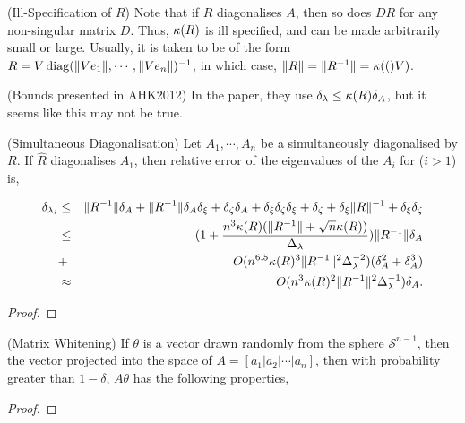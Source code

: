 \begin{remark} (Ill-Specification of $R$)
  Note that if $R$ diagonalises $A$, then so does $DR$ for any non-singular matrix $D$. Thus, $\kappa(R)$ is ill specified, and can be made arbitrarily small or large. Usually, it is taken to be of the form $R = V\operatorname{diag}(\|V e_1\|, \cdots, \|V e_n\|)^{-1}$, in which case, $\|R\| = \|R^{-1}\| = \kappa(()V)$.
\end{remark}

\begin{remark} (Bounds presented in AHK2012)
    In the paper, they use $\delta_{\lambda} \le \kappa(R)\delta_A$, but
    it seems like this may not be true.
\end{remark}

\begin{proposition}(Simultaneous Diagonalisation)
  \label{prop:sim-eigd}
  Let $A_1, \cdots, A_n$ be a simultaneously diagonalised by $R$. If $\hat{R}$ diagonalises $A_1$, then relative
    error of the eigenvalues of the $A_i$ for ($i > 1$) is,

    \begin{eqnarray}
    \delta_{\lambda_i} 
      &\le& \|R^{-1}\| \delta_{A} + \|R^{-1}\| \delta_{A} \delta_{\xi}
            + \delta_{\zeta} \delta_{A} + \delta_{\xi} \delta_{\zeta} \delta_{\xi}
            + \delta_{\zeta} + \delta_{\xi} \|R\|^{-1} + \delta_{\xi} \delta_{\zeta} \\
      &\le& (1 + \frac{ n^3 \kappa(R) (\|R^{-1}\| + \sqrt{n} \kappa(R))}{\Delta_{\lambda}} ) \|R^{-1}\| \delta_{A} \\ 
      &+& O(n^{6.5} \kappa(R)^3 \|R^{-1}\|^2 \Delta_{\lambda}^{-2}) (\delta_{A}^2 + \delta_{A}^3) \\
    &\approx& O(n^3 \kappa(R)^2 \|R^{-1}\|^2 \Delta_{\lambda}^{-1}) \delta_{A}.
    \end{eqnarray}
\end{proposition}

\begin{proof}
\end{proof}

\begin{proposition}(Matrix Whitening)
  \label{prop:white}
  If $\theta$ is a vector drawn randomly from the sphere
  $\mathcal{S}^{n-1}$, then the vector projected into the space of $A
  = [a_1 | a_2 | \cdots | a_n]$, then with probability greater than
  $1-\delta$, $A\theta$ has the following properties,
\end{proposition}
\begin{proof}
\end{proof}

